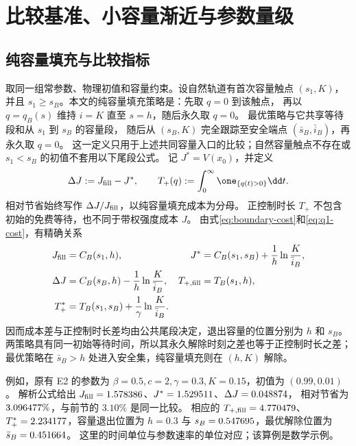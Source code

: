 \section{比较基准、小容量渐近与参数量级}
\label{sec:scaling}


\subsection{纯容量填充与比较指标}
取同一组常参数、物理初值和容量约束。设自然轨道有首次容量触点 $(s_1,K)$，
并且 $s_1\ge s_B$。本文的纯容量填充策略是：先取 $q=0$ 到该触点，
再以 $q=q_B(s)$ 维持 $i=K$ 直至 $s=h$，随后永久取 $q=0$。
最优策略与它共享等待段和从 $s_1$ 到 $s_B$ 的容量段，
随后从 $(s_B,K)$ 完全跟踪至安全端点 $(\bar s_B,\bar i_B)$，再永久取 $q=0$。
这一定义只用于上述共同容量入口的比较；自然容量触点不存在或 $s_1<s_B$ 的初值不套用以下尾段公式。
记 $J^*=V(x_0)$，并定义
\begin{equation}
 \Delta J:=J_{\rm fill}-J^*,\qquad
 T_+(q):=\int_0^\infty\one_{\{q(t)>0\}}\dd t.
 \label{eq:scaling-metrics}
\end{equation}
相对节省始终写作 $\Delta J/J_{\rm fill}$，以纯容量填充成本为分母。
正控制时长 $T_+$ 不包含初始的免费等待，也不同于带权强度成本 $J$。
由式\eqref{eq:boundary-cost}和\eqref{eq:q1-cost}，有精确关系
\begin{align}
 J_{\rm fill}&=C_B(s_1,h),&
 J^*&=C_B(s_1,s_B)+\frac1h\ln\frac K{\bar i_B},\notag\\
 \Delta J&=C_B(s_B,h)-\frac1h\ln\frac K{\bar i_B},&
 T_{+,\rm fill}&=T_B(s_1,h),\notag\\
 T_+^*&=T_B(s_1,s_B)+\frac1\gamma\ln\frac K{\bar i_B}.&&
 \label{eq:common-capacity-comparison}
\end{align}
因而成本差与正控制时长差均由公共尾段决定，退出容量的位置分别为 $h$ 和 $s_B$。
两策略具有同一初始等待时间，所以其永久解除时刻之差也等于正控制时长之差；
最优策略在 $\bar s_B>h$ 处进入安全集，纯容量填充则在 $(h,K)$ 解除。

例如，原有 E2 的参数为 $\beta=0.5,c=2,\gamma=0.3,K=0.15$，初值为 $(0.99,0.01)$。
解析公式给出 $J_{\rm fill}=1.578386$、$J^*=1.529511$、$\Delta J=0.048874$，
相对节省为 $3.096477\%$，与前节的 $3.10\%$ 是同一比较。
相应的 $T_{+,\rm fill}=4.770479$、$T_+^*=2.234177$，容量退出位置为
$h=0.3$ 与 $s_B=0.547695$，最优解除位置为 $\bar s_B=0.451664$。
这里的时间单位与参数速率的单位对应；该算例是数学示例。

